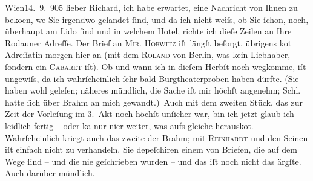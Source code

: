 \begin{ledgroupsized}[t]{13cm}
           \raggedleft{}{\pb}Wien14. 9. 905\pend
           \pstart
           lieber Richard, ich habe erwartet, eine Nachricht von Ihnen zu
                  beko{\geminationm}en, we{\geminationn} Sie
               irgendwo gelandet ſind, und da ich nicht weiſs, ob Sie ſchon, noch, überhaupt am Lido ſind und in welchem Hotel, richte ich dieſe
               Zeilen an Ihre Rodauner Adreſſe. Der Brief an \textsc{Mir. Horwitz} iſt längſt beſorgt, übrigens ko{\geminationm}t Adreſſatin
               morgen hier an (mit dem \textsc{Roland} von Berlin, was kein Liebhaber, ſondern ein \textsc{Caba{\pb}ret} iſt). Ob und wann ich in dieſem
               Herbſt noch wegkomme, iſt ungewiſs, da ich wahrſcheinlich ſehr bald Burgtheaterproben haben dürfte. (Sie haben wohl geleſen; näheres
               mündlich, die Sache iſt mir höchſt angenehm; Schl. hatte ſich über Brahm an mich
               gewandt.) Auch mit dem zweiten Stück, das zur Zeit der Vorleſung im 3. Akt noch höchſt unſicher war, bin
               ich jetzt glaub ich leidlich fertig – oder ka{\geminationn} nur ni{\geminationm}er weiter, was aufs gleiche {\pb}herausko{\geminationm}t. –
               Wahrſcheinlich kriegt auch das zweite der Brahm;
               mit \textsc{Reinhardt} und den Seinen iſt einfach nicht zu
               verhandeln. Sie depeſchiren einem von Briefen, die auf dem Wege ſind – und die nie
               geſchrieben wurden – und das iſt noch nicht das ärgſte. Auch darüber mündlich. –\pend

\end{ledgroupsized}
